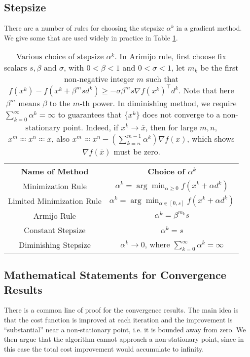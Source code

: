 \documentclass[12pt,a4paper]{article}
\numberwithin{equation}{section}
\theoremstyle{mystyle}
\newcommand{\grad}{\nabla}
\newcommand{\T}{\top}
\begin{document}
	\subsection{Stepsize}
	There are a number of rules for choosing the stepsize $\alpha^k$ in a gradient method. We give some that are used widely in practice in Table \ref{table:stepsize}.
	\begin{table}[]
		\centering
		\begin{tabular}{@{}cc@{}}
			\toprule
			Name of Method            & Choice of $\alpha^k$                                       \\ \midrule
			Minimization Rule         & $\alpha^k = \arg\min_{\alpha\geq 0} f(x^k+\alpha d^k)$     \\
			Limited Minimization Rule & $\alpha^k = \arg\min_{\alpha\in [0,s]} f(x^k+\alpha d^k)$  \\
			Armijo Rule               & $\alpha^k=\beta^{m_k}s$                                    \\
			Constant Stepsize         & $\alpha^k =s$                                              \\
			Diminishing Stepsize      & $\alpha^k\to 0$, where $\sum_{k=0}^\infty \alpha^k=\infty$ \\ \bottomrule
		\end{tabular}
	\caption{Various choice of stepsize $\alpha^k$. In Arimijo rule, first choose fix scalars $s,\beta$ and $\sigma$, with $0<\beta<1$ and $0<\sigma<1$, let $m_k$ be the first non-negative integer $m$ such that $f(x^k)-f(x^k+\beta^m s d^k)\geq -\sigma \beta^m s \grad f(x^k)^\T d^k$. Note that here $\beta^m$ means $\beta$ to the $m$-th power. In diminishing method, we require $\sum_{k=0}^{\infty}\alpha^k=\infty$ to guarantees that $\{x^k\}$ does not converge to a non-stationary point. Indeed, if $x^k\to\bar{x}$, then for large $m,n$, $x^m\approx x^n \approx \bar{x}$, also $x^m\approx x^n -(\sum_{k=n}^{m-1}\alpha^k)\grad f(\bar{x})$, which shows $\grad f(\bar{x})$ must be zero.}
	\label{table:stepsize}
	\end{table}
	
	
	
	\subsection{Mathematical Statements for Convergence Results}
	There is a common line of proof for the convergence results. The main idea is that the cost function is improved at each iteration and the improvement is ``substantial'' near a non-stationary point, i.e. it is bounded away from zero. We then argue that the algorithm cannot approach a non-stationary point, since in this case the total cost improvement would accumulate to infinity.
	
\end{document}
